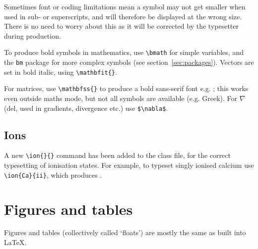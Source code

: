 \documentclass[fleqn,usenatbib,useAMS]{rasti}
\begin{document}
Sometimes font or coding limitations mean a symbol may not get smaller when used in sub- or superscripts, and will therefore be displayed at the wrong size. There is no need to worry about this as it will be corrected by the typesetter during production.

To produce bold symbols in mathematics, use \verb'\bmath' for simple variables, and the \verb'bm' package for more complex symbols (see section~\ref{sec:packages}). Vectors are set in bold italic, using \verb'\mathbfit{}'.

For matrices, use \verb'\mathbfss{}' to produce a bold sans-serif font e.g. ; this works even outside maths mode, but not all symbols are available (e.g. Greek). For $\nabla$ (del, used in gradients, divergence etc.) use \verb'$\nabla$'.

\subsection{Ions}

A new \verb'\ion{}{}' command has been added to the class file, for the correct typesetting of ionisation states.
For example, to typeset singly ionised calcium use \verb'\ion{Ca}{ii}', which produces .

\section{Figures and tables}
\label{sec:fig_table}
Figures and tables (collectively called `floats') are mostly the same as built into \LaTeX.
\end{document}
